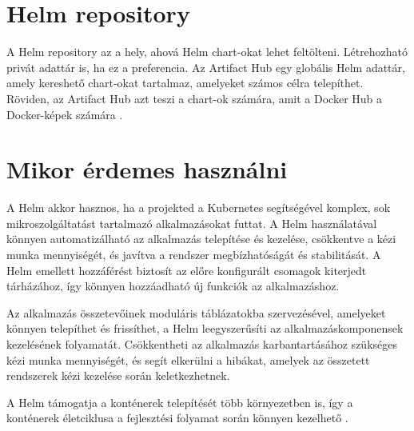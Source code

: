 \section{Helm repository}
A Helm repository az a hely, ahová Helm chart-okat lehet feltölteni.
Létrehozható privát adattár is, ha ez a preferencia.
Az Artifact Hub egy globális Helm adattár, amely kereshető chart-okat tartalmaz, amelyeket számos célra telepíthet.
Röviden, az Artifact Hub azt teszi a chart-ok számára, amit a Docker Hub a Docker-képek számára \cite{helm}.

\section{Mikor érdemes használni}
A Helm akkor hasznos, ha a projekted a Kubernetes segítségével komplex, sok mikroszolgáltatást tartalmazó alkalmazásokat futtat.
A Helm használatával könnyen automatizálható az alkalmazás telepítése és kezelése, csökkentve a kézi munka mennyiségét, és javítva a rendszer megbízhatóságát és stabilitását.
A Helm emellett hozzáférést biztosít az előre konfigurált csomagok kiterjedt tárházához, így könnyen hozzáadható új funkciók az alkalmazáshoz.

Az alkalmazás összetevőinek moduláris táblázatokba szervezésével, amelyeket könnyen telepíthet és frissíthet, a Helm leegyszerűsíti az alkalmazáskomponensek kezelésének folyamatát.
Csökkentheti az alkalmazás karbantartásához szükséges kézi munka mennyiségét, és segít elkerülni a hibákat, amelyek az összetett rendszerek kézi kezelése során keletkezhetnek.

A Helm támogatja a konténerek telepítését több környezetben is, így a konténerek életciklusa a fejlesztési folyamat során könnyen kezelhető \cite{helm}.